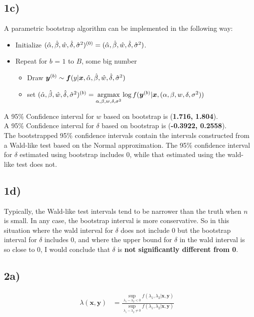 \documentclass[11pt]{article}
\begin{document}
\subsection*{1c)}
A parametric bootstrap algorithm can be implemented in the following way:\\

\begin{itemize}
  \item Initialize $(\hat\alpha,\hat\beta,\hat w,\hat\delta,\hat\sigma^2)^{(0)} = (\hat\alpha,\hat\beta,\hat w,\hat\delta,\hat\sigma^2)$.
  \item Repeat for $b$ = $1$ to $B$, some big number
  \begin{itemize}
    \item Draw $\bm y^{(b)} \sim \bm f(y|\bm x,\hat\alpha,\hat\beta,\hat w,\hat\delta,\hat\sigma^2)$
    \item set $(\hat\alpha,\hat\beta,\hat w,\hat\delta,\hat\sigma^2)^{(b)}= \underset{\alpha,\beta,w,\delta,\sigma^2}{\text{argmax}}\log f(\bm y^{(b)}|\bm x,(\alpha,\beta,w,\delta,\sigma^2))$
  \end{itemize}
\end{itemize}


\noindent
A 95\% Confidence interval for $w$ based on bootstrap is (\textbf{1.716, 1.804}).\\
A 95\% Confidence interval for $\delta$ based on bootstrap is (\textbf{-0.3922, 0.2558}).\\

\noindent
The bootstrapped 95\% confidence intervals contain the intervals constructed
from a Wald-like test based on the Normal approximation. The 95\% confidence
interval for $\delta$ estimated using bootstrap includes 0, while that estimated
using the wald-like test does not.

\subsection*{1d)}
Typically, the Wald-like test intervals tend to be narrower than the truth when
$n$ is small. In any case, the bootstrap interval is more conservative. So in
this situation where the wald interval for $\delta$ does not include 0 but the
bootstrap interval for $\delta$ includes 0, and where the upper bound for
$\delta$ in the wald interval is so close to 0, I would conclude that $\delta$
is \textbf{not significantly different from 0}.

\subsection*{2a)}
\[
\begin{aligned}
  \lambda(\bm x, \bm y) &= \frac{\underset{\lambda_1-\lambda_2 < 0}{\sup} f(\lambda_1, \lambda_2 | \bm x, \bm y)}{\underset{\lambda_1-\lambda_2 \ne 0}{\sup} f(\lambda_1, \lambda_2 | \bm x, \bm y)}\\
\end{aligned}
\]
\end{document}
